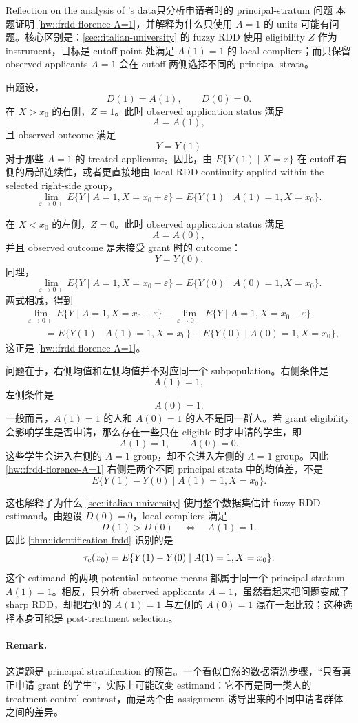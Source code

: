 \begin{exercisesolution}{Reflection on the analysis of \citet{li2015evaluating}'s data}{只分析申请者时的 principal-stratum 问题}
本题证明 \cref{hw::frdd-florence-A=1}，并解释为什么只使用 $A=1$ 的 units 可能有问题。核心区别是：\cref{sec::italian-university} 的 fuzzy RDD 使用 eligibility $Z$ 作为 instrument，目标是 cutoff point 处满足 $A(1)=1$ 的 local compliers；而只保留 observed applicants $A=1$ 会在 cutoff 两侧选择不同的 principal strata。

由题设，
\[
D(1)=A(1),\qquad D(0)=0.
\]
在 $X>x_0$ 的右侧，$Z=1$。此时 observed application status 满足
\[
A=A(1),
\]
且 observed outcome 满足
\[
Y=Y(1)
\]
对于那些 $A=1$ 的 treated applicants。因此，由 $E\{Y(1)\mid X=x\}$ 在 cutoff 右侧的局部连续性，或者更直接地由 local RDD continuity applied within the selected right-side group，
\[
\lim_{\varepsilon\to 0+}
E\{Y\mid A=1,X=x_0+\varepsilon\}
=
E\{Y(1)\mid A(1)=1,X=x_0\}.
\]

在 $X<x_0$ 的左侧，$Z=0$。此时 observed application status 满足
\[
A=A(0),
\]
并且 observed outcome 是未接受 grant 时的 outcome：
\[
Y=Y(0).
\]
同理，
\[
\lim_{\varepsilon\to 0+}
E\{Y\mid A=1,X=x_0-\varepsilon\}
=
E\{Y(0)\mid A(0)=1,X=x_0\}.
\]
两式相减，得到
\begin{align*}
&\lim_{\varepsilon \rightarrow 0+} E\{ Y \mid A  = 1, X = x_0 + \varepsilon \}
-
\lim_{\varepsilon \rightarrow 0+}  E\{ Y \mid A  = 1, X = x_0- \varepsilon  \}\\
&\qquad =
E\{ Y(1) \mid A(1)  = 1,   X = x_0   \}
-
E\{ Y(0) \mid A(0)  = 1,   X = x_0   \},
\end{align*}
这正是 \cref{hw::frdd-florence-A=1}。

问题在于，右侧均值和左侧均值并不对应同一个 subpopulation。右侧条件是
\[
A(1)=1,
\]
左侧条件是
\[
A(0)=1.
\]
一般而言，$A(1)=1$ 的人和 $A(0)=1$ 的人不是同一群人。若 grant eligibility 会影响学生是否申请，那么存在一些只在 eligible 时才申请的学生，即
\[
A(1)=1,\qquad A(0)=0.
\]
这些学生会进入右侧的 $A=1$ group，却不会进入左侧的 $A=1$ group。因此 \cref{hw::frdd-florence-A=1} 右侧是两个不同 principal strata 中的均值差，不是
\[
E\{Y(1)-Y(0)\mid A(1)=1,X=x_0\}.
\]

这也解释了为什么 \cref{sec::italian-university} 使用整个数据集估计 fuzzy RDD estimand。由题设 $D(0)=0$，local compliers 满足
\[
D(1)>D(0)
\quad\Longleftrightarrow\quad
A(1)=1.
\]
因此 \cref{thm::identification-frdd} 识别的是
\[
\tau_{\textup{c}}(x_0)
=
E\{Y(1)-Y(0)\mid A(1)=1,X=x_0\}.
\]
这个 estimand 的两项 potential-outcome means 都属于同一个 principal stratum $A(1)=1$。相反，只分析 observed applicants $A=1$，虽然看起来把问题变成了 sharp RDD，却把右侧的 $A(1)=1$ 与左侧的 $A(0)=1$ 混在一起比较；这种选择本身可能是 post-treatment selection。

\paragraph{Remark.}
这道题是 principal stratification 的预告。一个看似自然的数据清洗步骤，``只看真正申请 grant 的学生''，实际上可能改变 estimand：它不再是同一类人的 treatment-control contrast，而是两个由 assignment 诱导出来的不同申请者群体之间的差异。
\end{exercisesolution}
